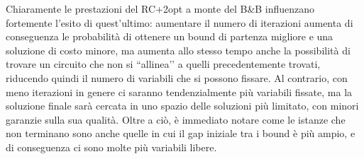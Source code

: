 Chiaramente le prestazioni del RC+2opt a monte del B\&B influenzano fortemente l’esito di quest’ultimo: aumentare il numero di iterazioni aumenta di conseguenza le probabilità di ottenere un bound di partenza migliore e una soluzione di costo minore, ma aumenta allo stesso tempo anche la possibilità di trovare un circuito che non si ``allinea’’ a quelli precedentemente trovati, riducendo quindi il numero di variabili che si possono fissare. Al contrario, con meno iterazioni in genere ci saranno tendenzialmente più variabili fissate, ma la soluzione finale sarà cercata in uno spazio delle soluzioni più limitato, con minori garanzie sulla sua qualità. Oltre a ciò, è immediato notare come le istanze che non terminano sono anche quelle in cui il gap iniziale tra i bound è più ampio, e di conseguenza ci sono molte più variabili libere.

